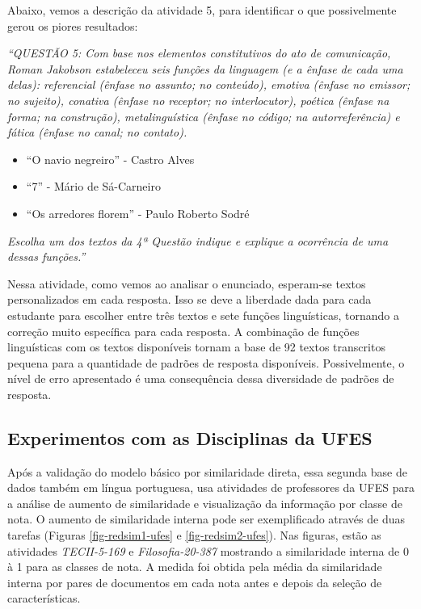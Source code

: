 Abaixo, vemos a descrição da atividade 5, para identificar o que possivelmente gerou os piores resultados:

\noindent\textit{``QUESTÃO 5: Com base nos elementos constitutivos do ato de comunicação, Roman Jakobson estabeleceu seis funções da linguagem (e a ênfase de cada uma delas): referencial (ênfase no assunto; no conteúdo), emotiva (ênfase no emissor; no sujeito), conativa (ênfase no receptor; no interlocutor), poética (ênfase na forma; na construção), metalinguística (ênfase no código; na autorreferência) e fática (ênfase no canal; no contato).}
\begin{itemize}
\item ``O navio negreiro'' - Castro Alves
\item ``7'' - Mário de Sá-Carneiro
\item ``Os arredores florem'' - Paulo Roberto Sodré
\end{itemize}
\textit{Escolha um dos textos da 4ª Questão indique e explique a ocorrência de uma dessas funções.''}

Nessa atividade, como vemos ao analisar o enunciado, esperam-se textos personalizados em cada resposta. Isso se deve a liberdade dada para cada estudante para escolher entre três textos e sete funções linguísticas, tornando a correção muito específica para cada resposta. A combinação de funções linguísticas com os textos disponíveis tornam a base de 92 textos transcritos pequena para a quantidade de padrões de resposta disponíveis. Possivelmente, o nível de erro apresentado é uma consequência dessa diversidade de padrões de resposta.

\subsection{Experimentos com as Disciplinas da UFES}
Após a validação do modelo básico por similaridade direta, essa segunda base de dados também em língua portuguesa, usa atividades de professores da UFES para a análise de aumento de similaridade e visualização da informação por classe de nota. O aumento de similaridade interna pode ser exemplificado através de duas tarefas (Figuras \ref{fig-redsim1-ufes} e \ref{fig-redsim2-ufes}). Nas figuras, estão as atividades \textit{TECII-5-169} e \textit{Filosofia-20-387} mostrando a similaridade interna de 0 à 1 para as classes de nota. A medida foi obtida pela média da similaridade interna por pares de documentos em cada nota antes e depois da seleção de características.

